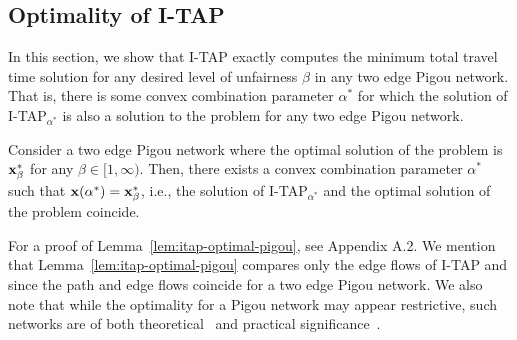 \documentclass{article}
\newif\ifarxiv   %
\begin{document}
\subsection{Optimality of I-TAP} \label{sec:optimality}

In this section, we show that I-TAP exactly computes the minimum total travel time solution for any desired level of unfairness $\beta$ in any two edge Pigou network. That is, there is some convex combination parameter $\alpha^*$ for which the solution of I-TAP$_{\alpha^*}$ is also a solution to the \fso problem for any two edge Pigou network. 

\begin{lemma}  \label{lem:itap-optimal-pigou}
Consider a two edge Pigou network where the optimal solution of the \fso problem is $\mathbf{x}_{\beta}^*$ for any $\beta \in [1, \infty)$. Then, there exists a convex combination parameter $\alpha^*$ such that $\mathbf{x}(\alpha^*) = \mathbf{x}_{\beta}^*$, i.e., the solution of I-TAP$_{\alpha^*}$ and the optimal solution of the \fso problem coincide.
\end{lemma}

For a proof of Lemma~\ref{lem:itap-optimal-pigou}, see \ifarxiv Appendix~\ref{apdx:pf-pigou-optimal}\else Appendix A.2\fi. We mention that Lemma~\ref{lem:itap-optimal-pigou} compares only the edge flows of I-TAP and \fso since the path and edge flows coincide for a two edge Pigou network. We also note that while the optimality for a Pigou network may appear restrictive, such networks are of both theoretical~\cite{pigou,how-bad-is-selfish} and practical significance~\cite{caltrans}. %




\end{document}
